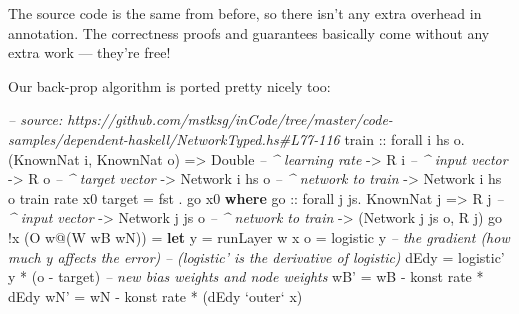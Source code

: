 \documentclass[]{article}
\newenvironment{Shaded}{\begin{snugshade}}{\end{snugshade}}
\newcommand{\CommentTok}[1]{\textcolor[rgb]{0.56,0.35,0.01}{\textit{#1}}}
\newcommand{\DataTypeTok}[1]{\textcolor[rgb]{0.13,0.29,0.53}{#1}}
\newcommand{\FunctionTok}[1]{\textcolor[rgb]{0.00,0.00,0.00}{#1}}
\newcommand{\KeywordTok}[1]{\textcolor[rgb]{0.13,0.29,0.53}{\textbf{#1}}}
\newcommand{\NormalTok}[1]{#1}
\newcommand{\OtherTok}[1]{\textcolor[rgb]{0.56,0.35,0.01}{#1}}
\begin{document}
The source code is the same from before, so there isn't any extra overhead in
annotation. The correctness proofs and guarantees basically come without any
extra work --- they're free!

Our back-prop algorithm is ported pretty nicely too:

\begin{Shaded}
\begin{Highlighting}[]
\CommentTok{-- source: https://github.com/mstksg/inCode/tree/master/code-samples/dependent-haskell/NetworkTyped.hs#L77-116}
\OtherTok{train ::}\NormalTok{ forall i hs o}\FunctionTok{.}\NormalTok{ (}\DataTypeTok{KnownNat}\NormalTok{ i, }\DataTypeTok{KnownNat}\NormalTok{ o)}
      \OtherTok{=>} \DataTypeTok{Double}           \CommentTok{-- ^ learning rate}
      \OtherTok{->} \DataTypeTok{R}\NormalTok{ i              }\CommentTok{-- ^ input vector}
      \OtherTok{->} \DataTypeTok{R}\NormalTok{ o              }\CommentTok{-- ^ target vector}
      \OtherTok{->} \DataTypeTok{Network}\NormalTok{ i hs o   }\CommentTok{-- ^ network to train}
      \OtherTok{->} \DataTypeTok{Network}\NormalTok{ i hs o}
\NormalTok{train rate x0 target }\FunctionTok{=}\NormalTok{ fst }\FunctionTok{.}\NormalTok{ go x0}
  \KeywordTok{where}
\OtherTok{    go  ::}\NormalTok{ forall j js}\FunctionTok{.} \DataTypeTok{KnownNat}\NormalTok{ j}
        \OtherTok{=>} \DataTypeTok{R}\NormalTok{ j              }\CommentTok{-- ^ input vector}
        \OtherTok{->} \DataTypeTok{Network}\NormalTok{ j js o   }\CommentTok{-- ^ network to train}
        \OtherTok{->}\NormalTok{ (}\DataTypeTok{Network}\NormalTok{ j js o, }\DataTypeTok{R}\NormalTok{ j)}
\NormalTok{    go }\FunctionTok{!}\NormalTok{x (}\DataTypeTok{O}\NormalTok{ w}\FunctionTok{@}\NormalTok{(}\DataTypeTok{W}\NormalTok{ wB wN))}
        \FunctionTok{=} \KeywordTok{let}\NormalTok{ y    }\FunctionTok{=}\NormalTok{ runLayer w x}
\NormalTok{              o    }\FunctionTok{=}\NormalTok{ logistic y}
              \CommentTok{-- the gradient (how much y affects the error)}
              \CommentTok{--   (logistic' is the derivative of logistic)}
\NormalTok{              dEdy }\FunctionTok{=}\NormalTok{ logistic' y }\FunctionTok{*}\NormalTok{ (o }\FunctionTok{-}\NormalTok{ target)}
              \CommentTok{-- new bias weights and node weights}
\NormalTok{              wB'  }\FunctionTok{=}\NormalTok{ wB }\FunctionTok{-}\NormalTok{ konst rate }\FunctionTok{*}\NormalTok{ dEdy}
\NormalTok{              wN'  }\FunctionTok{=}\NormalTok{ wN }\FunctionTok{-}\NormalTok{ konst rate }\FunctionTok{*}\NormalTok{ (dEdy }\OtherTok{`outer`}\NormalTok{ x)}

\end{Highlighting}
\end{Shaded}
\end{document}
